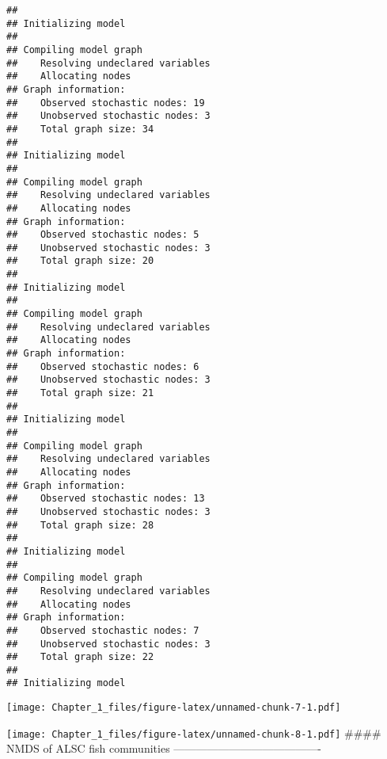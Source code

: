 \documentclass[
]{article}
\begin{document}
\begin{verbatim}
## 
## Initializing model
## 
## Compiling model graph
##    Resolving undeclared variables
##    Allocating nodes
## Graph information:
##    Observed stochastic nodes: 19
##    Unobserved stochastic nodes: 3
##    Total graph size: 34
## 
## Initializing model
## 
## Compiling model graph
##    Resolving undeclared variables
##    Allocating nodes
## Graph information:
##    Observed stochastic nodes: 5
##    Unobserved stochastic nodes: 3
##    Total graph size: 20
## 
## Initializing model
## 
## Compiling model graph
##    Resolving undeclared variables
##    Allocating nodes
## Graph information:
##    Observed stochastic nodes: 6
##    Unobserved stochastic nodes: 3
##    Total graph size: 21
## 
## Initializing model
## 
## Compiling model graph
##    Resolving undeclared variables
##    Allocating nodes
## Graph information:
##    Observed stochastic nodes: 13
##    Unobserved stochastic nodes: 3
##    Total graph size: 28
## 
## Initializing model
## 
## Compiling model graph
##    Resolving undeclared variables
##    Allocating nodes
## Graph information:
##    Observed stochastic nodes: 7
##    Unobserved stochastic nodes: 3
##    Total graph size: 22
## 
## Initializing model
\end{verbatim}

\texttt{[image: Chapter\_1\_files/figure-latex/unnamed-chunk-7-1.pdf]}

\texttt{[image: Chapter\_1\_files/figure-latex/unnamed-chunk-8-1.pdf]}
\#\#\#\# NMDS of ALSC fish communities
----------------------------------------
\end{document}
